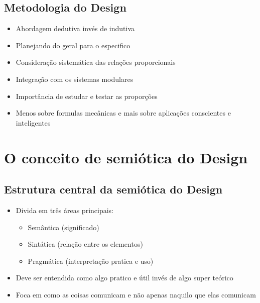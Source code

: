 \documentclass{article}
\begin{document}
\subsection{Metodologia do Design}
\begin{itemize}
    \item Abordagem dedutiva invés de indutiva
    \item Planejando do geral para o especifico
    \item Consideração sistemática das relações proporcionais
    \item Integração com os sistemas modulares
    \item Importância de estudar e testar as proporções
    \item Menos sobre formulas mecânicas e mais sobre aplicações conscientes e inteligentes
\end{itemize}
\newpage

\section{O conceito de semiótica do Design}
\subsection{Estrutura central da semiótica do Design}
\begin{itemize}
    \item Divida em três áreas principais:
    \begin{itemize}
        \item Semântica (significado)
        \item Sintática (relação entre os elementos)
        \item Pragmática (interpretação pratica e uso)
    \end{itemize}
    \item Deve ser entendida como algo pratico e útil invés de algo super teórico
    \item Foca em como as coisas comunicam e não apenas naquilo que elas comunicam
\end{itemize}
\end{document}
